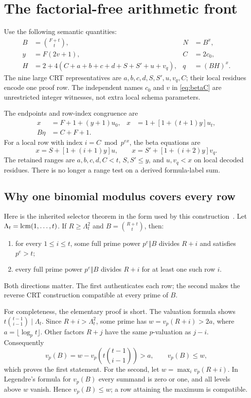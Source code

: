 \section{The factorial-free arithmetic front}

Use the following semantic quantities:
\begin{align}
 B&=\binom{F+t}{t},& N&=B^x,\label{eq:BN}\\
 y&=F(2v+1),& C&=2c_0,\label{eq:betaC}\\
 H&=2+4(C+a+b+c+d+S+S'+u+v_q),&q&=(BH)^x.\label{eq:radix}
\end{align}
The nine large CRT representatives are
$a,b,c,d,S,S',u,v_q,C$; their local residues encode one proof row.
The independent names $c_0$ and $v$ in \eqref{eq:betaC} are unrestricted
integer witnesses, not extra local schema parameters.

The endpoints and row-index congruence are
\begin{align}
 x&=F+1+(y+1)u_0,
 &x&=1+[1+(t+1)y]u_t,\label{eq:endpoints}\\
 B\eta&=C+F+1.\label{eq:selector}
\end{align}
For a local row with index $i=C\bmod p^{ex}$, the beta equations are
\[
 x=S+[1+(i+1)y]u,\qquad
 x=S'+[1+(i+2)y]v_q.
\]
The retained ranges are $a,b,c,d,C<t$, $S,S'\le y$, and $u,v_q<x$
on local decoded residues. There is no longer a range test on a derived
formula-label sum.

\subsection{Why one binomial modulus covers every row}

Here is the inherited selector theorem in the form used by this
construction~\cite{factorialfree}. Let $\Lambda_t=\operatorname{lcm}(1,\ldots,t)$.
If $R\ge\Lambda_t^2$ and $B=\binom{R+t}{t}$, then:
\begin{enumerate}
\item for every $1\le i\le t$, some full prime power $p^e\Vert B$
      divides $R+i$ and satisfies $p^e>t$;
\item every full prime power $p^e\Vert B$ divides $R+i$ for at least one
      such row $i$.
\end{enumerate}
Both directions matter. The first authenticates each row; the second
makes the reverse CRT construction compatible at every prime of $B$.

For completeness, the elementary proof is short. The valuation formula
shows $t\binom{t-1}{i-1}\mid\Lambda_t$. Since $R+i>\Lambda_t^2$,
some prime has $w=v_p(R+i)>2a$, where
$a=\lfloor\log_p t\rfloor$. Other factors $R+j$ have the same
$p$-valuation as $j-i$. Consequently
\[
 v_p(B)=w-v_p\left(t\binom{t-1}{i-1}\right)>a,
 \qquad v_p(B)\le w,
\]
which proves the first statement. For the second, let
$w=\max_i v_p(R+i)$. In Legendre's formula for $v_p(B)$ every summand
is zero or one, and all levels above $w$ vanish. Hence $v_p(B)\le w$;
a row attaining the maximum is compatible.


